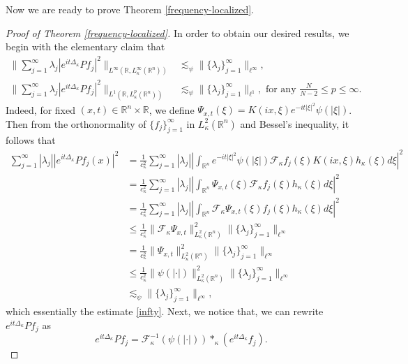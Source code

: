 \documentclass[a4paper,11pt, reqno]{amsart}
\numberwithin{equation}{section}
\theoremstyle{plain}
\theoremstyle{definition}
\theoremstyle{remark}
\begin{document}
Now we are ready to prove Theorem \ref{frequency-localized}.
\begin{proof}[Proof of Theorem \ref{frequency-localized}]
In order to obtain our desired results, we begin with the elementary claim that
\begin{align}
			\bigg\|\sum_{j=1}^\infty \lambda_j|e^{it\Delta_\kappa}Pf_j|^2\bigg\|_{L^\infty(\mathbb{R}, L_\kappa^\infty(\mathbb{R}^n))}&\lesssim_\psi \|\{\lambda_j\}^\infty_{j=1}\|_{\ell^\infty},\label{infty}\\
   \bigg\|\sum_{j=1}^\infty \lambda_j|e^{it\Delta_\kappa}Pf_j|^2\bigg\|_{L^1(\mathbb{R}, L_\kappa^p(\mathbb{R}^n))}&\lesssim_\psi \|\{\lambda_j\}^\infty_{j=1}\|_{\ell^1},\text{ for any } \frac{N}{N-2}\leq p\leq\infty.\label{q=1}
\end{align}	
Indeed, for fixed  $(x,t)\in\mathbb{R}^n\times\mathbb{R}$, we define $\Psi_{x,t}(\xi)=K(ix,\xi)e^{-it|\xi|^2}\psi(|\xi|)$. Then from the orthonormality of $\{f_j\}_{j=1}^\infty$ in $L_\kappa^2(\mathbb{R}^n)$ and Bessel's inequality, it follows that 
\begin{align*}
  \sum_{j=1}^\infty |\lambda_j||e^{it\Delta_\kappa}Pf_j(x)|^2&=\frac{1}{c^2_\kappa} \sum_{j=1}^\infty |\lambda_j|\left|\int_{\mathbb{R}^n}e^{-it|\xi|^2}\psi(|\xi|)\mathcal{F}_\kappa f_j(\xi)K(ix,\xi)h_\kappa(\xi)d\xi\right|^2\\
  &=\frac{1}{c^2_\kappa} \sum_{j=1}^\infty |\lambda_j| \left|\int_{\mathbb{R}^n}\Psi_{x,t}(\xi) \mathcal{F}_\kappa f_j(\xi)h_\kappa(\xi)d\xi\right|^2\\
  &=\frac{1}{c^2_\kappa} \sum_{j=1}^\infty |\lambda_j| \left|\int_{\mathbb{R}^n}\mathcal{F}_\kappa \Psi_{x,t}(\xi)f_j(\xi)h_\kappa(\xi)d\xi\right|^2\\
  &\leq \frac{1}{c^2_\kappa} \|\mathcal{F}_\kappa \Psi_{x,t}\|^2_{L_\kappa^2(\mathbb{R}^n)}\|\{\lambda_j\}^\infty_{j=1}\|_{\ell^\infty} \\
  &=\frac{1}{c^2_\kappa} \|\Psi_{x,t}\|^2_{L_\kappa^2(\mathbb{R}^n)}\|\{\lambda_j\}^\infty_{j=1}\|_{\ell^\infty} \\
  &\leq \frac{1}{c^2_\kappa} \|\psi(|\cdot|)\|^2_{L_\kappa^2(\mathbb{R}^n)}\|\{\lambda_j\}^\infty_{j=1}\|_{\ell^\infty}\\
  &\lesssim_\psi \|\{\lambda_j\}^\infty_{j=1}\|_{\ell^\infty},
\end{align*}
which essentially the estimate \eqref{infty}. Next, we notice that, we can  rewrite $e^{it\Delta_\kappa}Pf_j$ as 
\begin{equation*}
    e^{it\Delta_\kappa}Pf_j=\mathcal{F}^{-1}_\kappa (\psi(|\cdot|))*_\kappa \left(e^{it\Delta_\kappa}f_j\right).

\end{equation*}
\end{proof}
\end{document}
